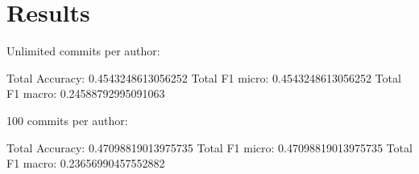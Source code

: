 \section{Results}
\label{sec:results}

Unlimited commits per author:

Total Accuracy: 0.4543248613056252
Total F1 micro: 0.4543248613056252
Total F1 macro: 0.24588792995091063

100 commits per author:

Total Accuracy: 0.47098819013975735
Total F1 micro: 0.47098819013975735
Total F1 macro: 0.23656990457552882